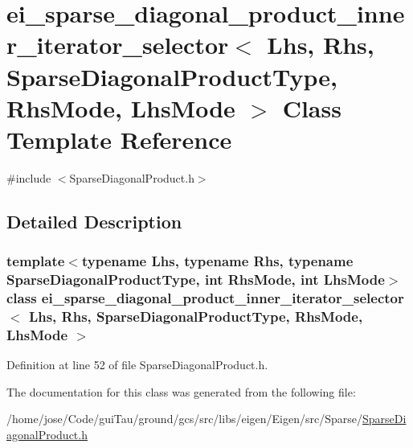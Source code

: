 \hypertarget{classei__sparse__diagonal__product__inner__iterator__selector}{\section{ei\-\_\-sparse\-\_\-diagonal\-\_\-product\-\_\-inner\-\_\-iterator\-\_\-selector$<$ Lhs, Rhs, Sparse\-Diagonal\-Product\-Type, Rhs\-Mode, Lhs\-Mode $>$ Class Template Reference}
\label{classei__sparse__diagonal__product__inner__iterator__selector}
}


{\ttfamily \#include $<$Sparse\-Diagonal\-Product.\-h$>$}



\subsection{Detailed Description}
\subsubsection*{template$<$typename Lhs, typename Rhs, typename Sparse\-Diagonal\-Product\-Type, int Rhs\-Mode, int Lhs\-Mode$>$class ei\-\_\-sparse\-\_\-diagonal\-\_\-product\-\_\-inner\-\_\-iterator\-\_\-selector$<$ Lhs, Rhs, Sparse\-Diagonal\-Product\-Type, Rhs\-Mode, Lhs\-Mode $>$}



Definition at line 52 of file Sparse\-Diagonal\-Product.\-h.



The documentation for this class was generated from the following file\-:\begin{DoxyCompactItemize}
\item 
/home/jose/\-Code/gui\-Tau/ground/gcs/src/libs/eigen/\-Eigen/src/\-Sparse/\hyperlink{_sparse_diagonal_product_8h}{Sparse\-Diagonal\-Product.\-h}\end{DoxyCompactItemize}
